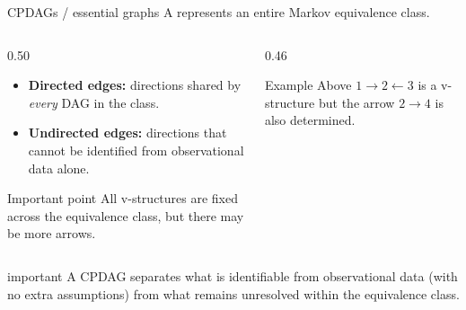 \documentclass[dvipsnames,aspectratio=169,handout]{beamer}
\begin{document}
\begin{frame}{CPDAGs / essential graphs}
A  represents an entire Markov equivalence class.

\begin{columns}[T]
\begin{column}{0.50\textwidth}
\begin{block}{}
\begin{itemize}
    \item \textbf{Directed edges:} directions shared by \emph{every} DAG in the class.
    \item \textbf{Undirected edges:} directions that cannot be identified from observational data alone.
\end{itemize}
\end{block}

\begin{alertblock}{Important point}
All v-structures are fixed across the equivalence class,
but there may be more arrows. 
\end{alertblock}
\end{column}

\begin{column}{0.46\textwidth}
\begin{center}
\end{center}

\vspace{1mm}

\begin{block}{Example}
Above $1\to2\leftarrow 3$ is a v-structure but the arrow $2\to4$ is also determined.\end{block}
\end{column}
\end{columns}

\vspace{1mm}
\begin{beamercolorbox}[wd=\textwidth,sep=7pt,center,rounded=true,shadow=true]{important}\small 
A CPDAG separates what is identifiable from observational data (with no extra assumptions) from what remains unresolved within the equivalence class.
\end{beamercolorbox}
\end{frame}
\end{document}
